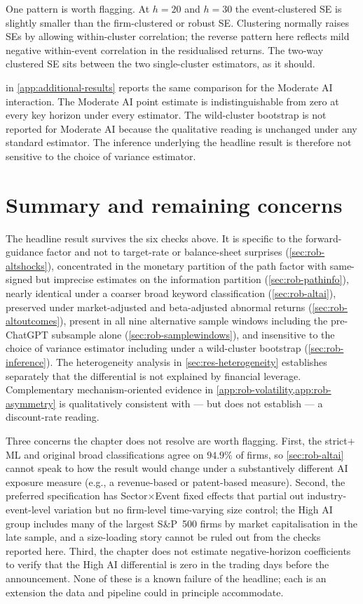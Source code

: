 One pattern is worth flagging. At $h = 20$ and $h = 30$ the
event-clustered SE is slightly smaller than the firm-clustered or
robust SE. Clustering normally raises SEs by allowing within-cluster
correlation; the reverse pattern here reflects mild negative
within-event correlation in the residualised returns. The two-way
clustered SE sits between the two single-cluster estimators, as it
should.

 in \cref{app:additional-results}
reports the same comparison for the Moderate AI interaction. The
Moderate AI point estimate is indistinguishable from zero at every
key horizon under every estimator. The wild-cluster bootstrap is not
reported for Moderate AI because the qualitative reading is unchanged
under any standard estimator. The inference underlying the headline
result is therefore not sensitive to the choice of variance
estimator.

\section{Summary and remaining concerns}
\label{sec:rob-lp}

The headline result survives the six checks above. It is specific to
the forward-guidance factor and not to target-rate or balance-sheet
surprises (\cref{sec:rob-altshocks}), concentrated in the monetary
partition of the path factor with same-signed but imprecise estimates
on the information partition (\cref{sec:rob-pathinfo}), nearly
identical under a coarser broad keyword classification
(\cref{sec:rob-altai}), preserved under market-adjusted and
beta-adjusted abnormal returns (\cref{sec:rob-altoutcomes}), present
in all nine alternative sample windows including the pre-ChatGPT
subsample alone (\cref{sec:rob-samplewindows}), and insensitive to
the choice of variance estimator including under a wild-cluster
bootstrap (\cref{sec:rob-inference}). The heterogeneity analysis in
\cref{sec:res-heterogeneity} establishes separately that the
differential is not explained by financial leverage. Complementary
mechanism-oriented evidence in
\cref{app:rob-volatility,app:rob-asymmetry} is qualitatively
consistent with --- but does not establish --- a discount-rate
reading.

Three concerns the chapter does not resolve are worth flagging.
First, the strict$+$ML and original broad classifications agree on
$94.9\%$ of firms, so \cref{sec:rob-altai} cannot speak to how the
result would change under a substantively different AI exposure
measure (e.g., a revenue-based or patent-based measure). Second, the
preferred specification has Sector$\times$Event fixed effects that
partial out industry-event-level variation but no firm-level
time-varying size control; the High AI group includes many of the
largest S\&P~500 firms by market capitalisation in the late sample,
and a size-loading story cannot be ruled out from the checks reported
here. Third, the chapter does not estimate negative-horizon
coefficients to verify that the High AI differential is zero in the
trading days before the announcement. None of these is a known
failure of the headline; each is an extension the data and pipeline
could in principle accommodate.


